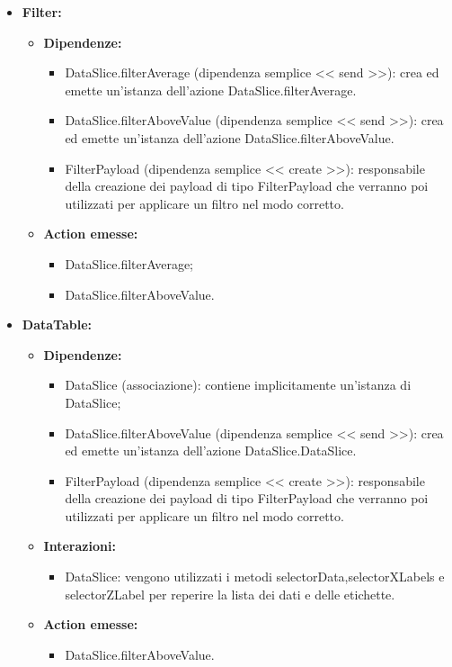 \begin{itemize}
    \item \textbf{Filter:}
    \begin{itemize}
        \item \textbf{Dipendenze:}
        \begin{itemize}
            \item DataSlice.filterAverage (dipendenza semplice << send >>): crea ed emette un’istanza dell’azione DataSlice.filterAverage.
            \item DataSlice.filterAboveValue (dipendenza semplice << send >>): crea ed emette un’istanza dell’azione DataSlice.filterAboveValue.
            \item FilterPayload (dipendenza semplice << create >>): responsabile della creazione dei payload di tipo FilterPayload che verranno poi utilizzati per applicare un filtro nel modo corretto.
        \end{itemize} 
        \item \textbf{Action emesse:}
        \begin{itemize}
            \item DataSlice.filterAverage;
            \item DataSlice.filterAboveValue.
        \end{itemize} 
    \end{itemize}

    \item \textbf{DataTable:}
    \begin{itemize}
        \item \textbf{Dipendenze:}
        \begin{itemize}
            \item DataSlice (associazione): contiene implicitamente un'istanza di DataSlice;
            \item DataSlice.filterAboveValue (dipendenza semplice << send >>): crea ed emette un’istanza dell’azione DataSlice.DataSlice.
            \item FilterPayload (dipendenza semplice << create >>): responsabile della creazione dei payload di tipo FilterPayload che verranno poi utilizzati per applicare un filtro nel modo corretto.
        \end{itemize} 
        \item \textbf{Interazioni:}
        \begin{itemize}
            \item DataSlice: vengono utilizzati i metodi selectorData,selectorXLabels e selectorZLabel per reperire la lista dei dati e delle etichette.
        \end{itemize} 
        \item \textbf{Action emesse:}
        \begin{itemize}
            \item DataSlice.filterAboveValue.
        \end{itemize} 
    \end{itemize}


\end{itemize}
